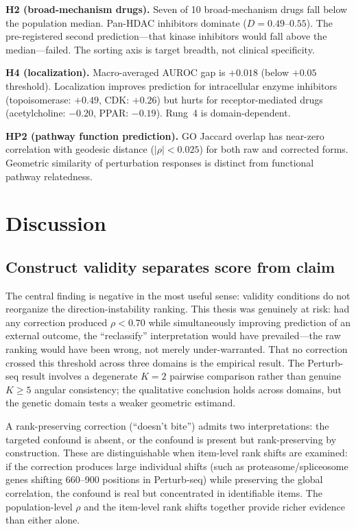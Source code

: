 \documentclass[11pt]{article}
\begin{document}
\textbf{H2 (broad-mechanism drugs).} Seven of 10 broad-mechanism drugs fall below the population median.
Pan-HDAC inhibitors dominate ($D = 0.49$--$0.55$). The pre-registered
second prediction---that kinase inhibitors would fall above the
median---failed. The sorting axis is target breadth, not clinical
specificity.

\textbf{H4 (localization).} Macro-averaged AUROC gap is $+0.018$ (below $+0.05$ threshold). Localization
improves prediction for intracellular enzyme inhibitors (topoisomerase:
$+0.49$, CDK: $+0.26$) but hurts for receptor-mediated drugs
(acetylcholine: $-0.20$, PPAR: $-0.19$). Rung~4 is domain-dependent.

\textbf{HP2 (pathway function prediction).} GO Jaccard overlap has near-zero correlation with geodesic distance
($|\rho| < 0.025$) for both raw and corrected forms. Geometric similarity
of perturbation responses is distinct from functional pathway relatedness.

\section{Discussion}

\subsection{Construct validity separates score from claim}

The central finding is negative in the most useful sense: validity conditions
do not reorganize the direction-instability ranking. This thesis was
genuinely at risk: had any correction produced $\rho < 0.70$ while
simultaneously improving prediction of an external outcome, the
``reclassify'' interpretation would have prevailed---the raw ranking
would have been wrong, not merely under-warranted. That no correction
crossed this threshold across three domains is the empirical result.
The Perturb-seq result involves a degenerate $K = 2$ pairwise comparison
rather than genuine $K \geq 5$ angular consistency; the qualitative
conclusion holds across domains, but the genetic domain tests a weaker
geometric estimand.

A rank-preserving correction (``doesn't bite'') admits two
interpretations: the targeted confound is absent, or the confound is
present but rank-preserving by construction. These are distinguishable
when item-level rank shifts are examined: if the correction produces
large individual shifts (such as proteasome/spliceosome genes shifting
660--900 positions in Perturb-seq) while preserving the global
correlation, the confound is real but concentrated in identifiable items.
The population-level $\rho$ and the item-level rank shifts together
provide richer evidence than either alone.
\end{document}
